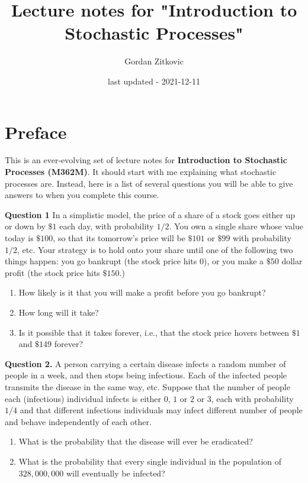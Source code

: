\documentclass[
]{book}
\title{Lecture notes for "Introduction to Stochastic Processes"}
\author{Gordan Zitkovic}
\date{last updated - 2021-12-11}
\providecommand{\tightlist}{%
  \setlength{\itemsep}{0pt}\setlength{\parskip}{0pt}}
\theoremstyle{definition}
\theoremstyle{definition}
\theoremstyle{definition}
\theoremstyle{definition}
\theoremstyle{remark}
\begin{document}
\maketitle

{
\setcounter{tocdepth}{1}
\tableofcontents
}
\hypertarget{preface}{%
\chapter*{Preface}\label{preface}}

This is an ever-evolving set of lecture notes for \textbf{Introduction to Stochastic Processes (M362M)}. It should start with me explaining what stochastic processes are. Instead, here is a list of several questions you will be able to give answers to when you complete this course.

\textbf{Question 1} In a simplistic model, the price of a share of a stock goes either up or down by \(\$1\) each day, with probability \(1/2\). You own a single share whose value today is \(\$100\), so that its tomorrow's price will be \(\$101\) or \(\$99\) with probability \(1/2\), etc. Your strategy is to hold onto your share until one of the following two things happen: you go bankrupt (the stock price hits \(0\)), or you make a \(\$50\) dollar profit (the stock price hits \(\$150\).)

\begin{enumerate}
\def\labelenumi{\arabic{enumi}.}
\tightlist
\item
  How likely is it that you will make a profit before you go bankrupt?
\item
  How long will it take?
\item
  Is it possible that it takes forever, i.e., that the stock price hovers between \(\$1\) and \(\$149\) forever?
\end{enumerate}

\textbf{Question 2.} A person carrying a certain disease infects a random number of people in a week, and then stops being infectious. Each of the infected people transmits the disease in the same way, etc. Suppose that the number of people each (infectious) individual infects is either \(0\), \(1\) or \(2\) or \(3\), each with probability \(1/4\) and that different infectious individuals may infect different number of people and behave independently of each other.

\begin{enumerate}
\def\labelenumi{\arabic{enumi}.}
\tightlist
\item
  What is the probability that the disease will ever be eradicated?
\item
  What is the probability that every single individual in the population of \(328,000,000\) will eventually be infected?
\end{enumerate}
\end{document}
